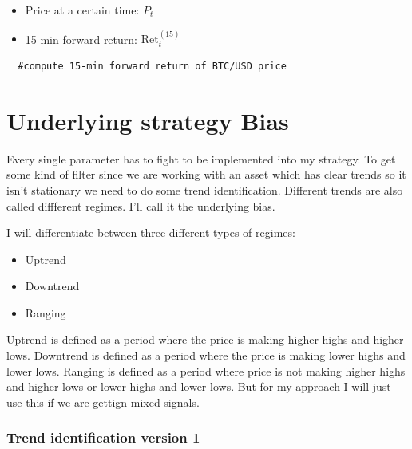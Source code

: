 \documentclass[12pt]{article}
\begin{document}
\begin{itemize}
  \item Price at a certain time: \space $P_t$
  \item 15-min forward return: \space $\mathrm{Ret}^{(15)}_t$
\end{itemize}





\begin{verbatim}
  #compute 15-min forward return of BTC/USD price
\end{verbatim}




\newpage






\section{Underlying strategy Bias}

Every single parameter has to fight to be implemented into my strategy. To get some kind of filter since we are working with an asset which has clear trends so it isn't stationary we need to do some trend identification. Different trends are also called diffferent regimes.
I'll call it the underlying bias. 

I will differentiate between three different types of regimes:
\begin{itemize}
  \item Uptrend
  \item Downtrend
  \item Ranging
\end{itemize}

Uptrend is defined as a period where the price is making higher highs and higher lows.
Downtrend is defined as a period where the price is making lower highs and lower lows.
Ranging is defined as a period where price is not making higher highs and higher lows or lower highs and lower lows. But for my approach I will just use this if we are gettign mixed signals. 



\subsubsection{Trend identification version 1}
\end{document}
